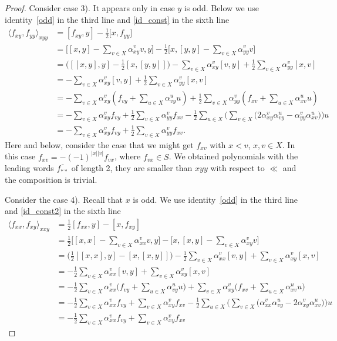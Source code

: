 \documentclass[10pt,a4paper]{amsart}
\begin{document}
\begin{proof}

Consider case 3). It appears only in case $y$ is odd. 
Below we use identity~\eqref{odd} in the third line and \eqref{id_const} in the sixth line  
\begin{align*}
\langle f_{xy}, f_{yy}\rangle_{xyy} &= [f_{xy},y] -  \frac{1}{2} \Big[x, f_{yy}\Big] \\
&=\Big[[x,y] - \sum_{v \in X} \alpha_{xy}^v v, y\Big]- \frac 12\Big[x,  [y,y] - \sum_{v \in X} \alpha_{yy}^v v\Big]\\
&=\Big([[x,y],y]-\frac 12[x,[y,y]]\Big)
-\sum_{v \in X}\alpha_{xy}^v [  v, y]+  \frac 12\sum_{v \in X}\alpha_{yy}^v[x,   v]\\
& =
-\sum_{v \in X}\alpha_{xy}^v [  v, y]+  \frac 12\sum_{v \in X}\alpha_{yy}^v[x,   v]\\
&=-\sum_{v \in X}\alpha_{xy}^v (f_{vy} + \sum_{u\in X}\alpha_{vy}^u u )+  
    \frac 12\sum_{v \in X}\alpha_{yy}^v( f_{xv}  +\sum_{u\in X} \alpha_{xv}^u u)\\
&=-\sum_{v \in X}\alpha_{xy}^v f_{vy}+ \frac 12\sum_{v \in X}\alpha_{yy}^v f_{xv}
  - \frac 12 \sum_{u\in X} \Big(\sum_{v\in X}\Big(2\alpha_{xy}^v  \alpha_{vy}^u -\alpha_{yy}^v\alpha_{xv}^u \Big)\Big)u\\
&=-\sum_{v \in X}\alpha_{xy}^v f_{vy}+ \frac 12\sum_{v \in X}\alpha_{yy}^v f_{xv}.  
\end{align*} 
Here and below, consider the case  that we might get  $f_{xv}$ with $x<v$, $x,v\in X$.
In this case $f_{xv}=-(-1)^{|x||v|} f_{vx}$, where $f_{vx}\in S$.
We obtained polynomials with the leading words $\overline{f_{**}}$ of length 2, they are smaller than $xyy$  with respect to $\ll $ and the composition is trivial.



Consider the case 4). Recall that $x$ is odd. We use identity~\eqref{odd} in the third line
and \eqref{id_const2} in the sixth line  
\begin{align*}
\langle f_{xx}, f_{xy} \rangle_{xxy} &=  \frac{1}{2}[f_{xx},y] - [x, f_{xy}]\\
&=\frac 12\Big [[x,x]-\sum_{v\in X} \alpha^v_{xx}v,y \Big]-\Big[x,[x,y]-\sum_{v\in X}\alpha_{xy}^v v \Big]\\
&=\Big(\frac 12 [[x,x],y]- [x,[x,y]]\Big)
-\frac 12\sum_{v\in X} \alpha^v_{xx}[v,y ]+\sum_{v\in X}\alpha_{xy}^v [x,v] \\
&  = -\frac 12\sum_{v\in X} \alpha^v_{xx}[v,y ]+\sum_{v\in X}\alpha_{xy}^v [x,v]  \\
&=-\frac 12\sum_{v\in X} \alpha^v_{xx}\Big (f_{vy}  + \sum_{u\in X}\alpha^u_{vy} u \Big)
+\sum_{v\in X}\alpha_{xy}^v \Big (f_{xv}  + \sum_{u\in X}\alpha^u_{xv} u \Big) \\
&=-\frac 12\sum_{v\in X} \alpha^v_{xx} f_{vy} +\sum_{v\in X}\alpha_{xy}^v  f_{xv}
 -  \frac 12\sum_{u\in X}\Big( \sum_{v\in X} \Big(\alpha^v_{xx} \alpha^u_{vy}  
-2\alpha_{xy}^v \alpha^u_{xv}\Big)\Big) u  \\
&=-\frac 12\sum_{v\in X} \alpha^v_{xx} f_{vy} +\sum_{v\in X}\alpha_{xy}^v  f_{xv}
\end{align*}
 


\end{proof}
\end{document}
